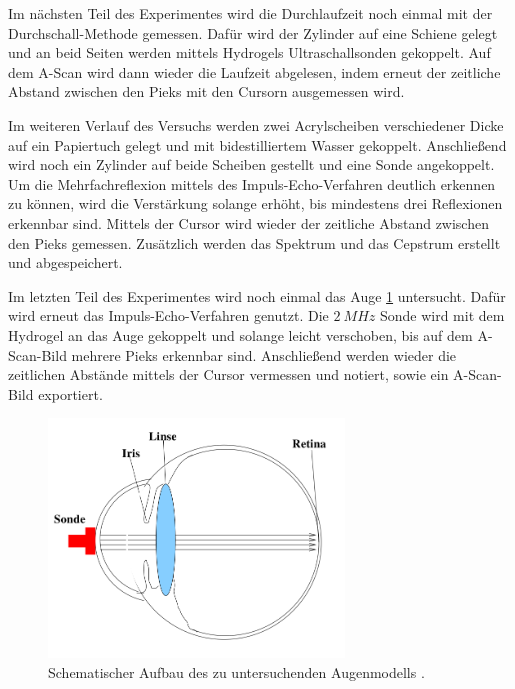 Im nächsten Teil des Experimentes wird die Durchlaufzeit noch einmal mit der
Durchschall-Methode gemessen. Dafür wird der Zylinder auf eine Schiene gelegt und
an beid Seiten werden mittels Hydrogels Ultraschallsonden gekoppelt. Auf dem
A-Scan wird dann wieder die Laufzeit abgelesen, indem erneut der zeitliche
Abstand zwischen den Pieks mit den Cursorn ausgemessen wird.

Im weiteren Verlauf des Versuchs werden zwei Acrylscheiben verschiedener Dicke
auf ein Papiertuch gelegt und mit bidestilliertem Wasser gekoppelt. Anschließend
wird noch ein Zylinder auf beide Scheiben gestellt und eine Sonde angekoppelt.
Um die Mehrfachreflexion mittels des Impuls-Echo-Verfahren deutlich erkennen zu
können, wird die Verstärkung
solange erhöht, bis mindestens drei Reflexionen erkennbar sind. Mittels der Cursor
wird wieder der zeitliche Abstand zwischen den Pieks gemessen. Zusätzlich werden
das Spektrum und das Cepstrum erstellt und abgespeichert.

Im letzten Teil des Experimentes wird noch einmal das Auge \ref{fig:Auge} untersucht. Dafür wird
erneut das Impuls-Echo-Verfahren genutzt. Die $\SI{2}{MHz}$ Sonde wird mit dem
Hydrogel an das Auge gekoppelt und solange leicht verschoben, bis auf dem A-Scan-Bild
mehrere Pieks erkennbar sind. Anschließend werden wieder die zeitlichen Abstände
mittels der Cursor vermessen und notiert, sowie ein A-Scan-Bild exportiert.

\begin{figure}
  \centering
  \includegraphics[width=0.7\textwidth]{Pics/Auge.png}
  \caption{Schematischer Aufbau des zu untersuchenden Augenmodells \cite{anleitung01}.}
  \label{fig:Auge}
\end{figure}
